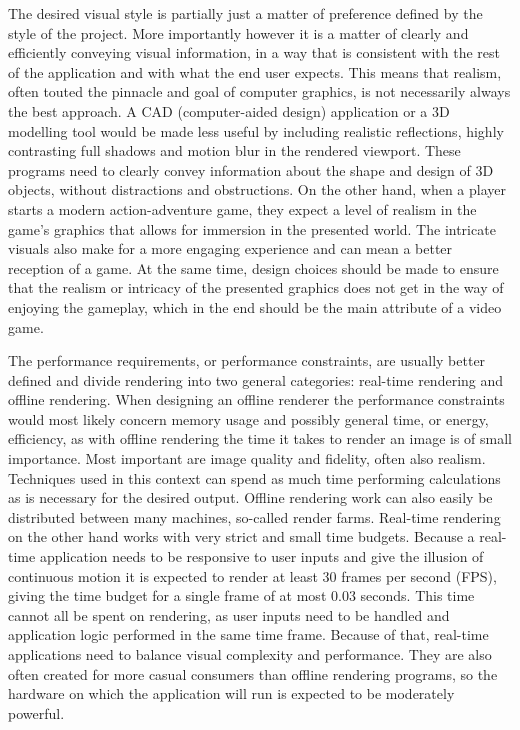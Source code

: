 The desired visual style is partially just a matter of preference defined by the style of the project. More importantly however it is a matter of clearly and efficiently conveying visual information, in a way that is consistent with the rest of the application and with what the end user expects. This means that realism, often touted the pinnacle and goal of computer graphics, is not necessarily always the best approach. A CAD (computer-aided design) application or a 3D modelling tool would be made less useful by including realistic reflections, highly contrasting full shadows and motion blur in the rendered viewport. These programs need to clearly convey information about the shape and design of 3D objects, without distractions and obstructions. On the other hand, when a player starts a modern action-adventure game, they expect a level of realism in the game's graphics that allows for immersion in the presented world. The intricate visuals also make for a more engaging experience and can mean a better reception of a game. At the same time, design choices should be made to ensure that the realism or intricacy of the presented graphics does not get in the way of enjoying the gameplay, which in the end should be the main attribute of a video game.

The performance requirements, or performance constraints, are usually better defined and divide rendering into two general categories: real-time rendering and offline rendering. When designing an offline renderer the performance constraints would most likely concern memory usage and possibly general time, or energy, efficiency, as with offline rendering the time it takes to render an image is of small importance. Most important are image quality and fidelity, often also realism. Techniques used in this context can spend as much time performing calculations as is necessary for the desired output. Offline rendering work can also easily be distributed between many machines, so-called render farms. Real-time rendering on the other hand works with very strict and small time budgets. Because a real-time application needs to be responsive to user inputs and give the illusion of continuous motion it is expected to render at least 30 frames per second (FPS), giving the time budget for a single frame of at most 0.03 seconds. This time cannot all be spent on rendering, as user inputs need to be handled and application logic performed in the same time frame. Because of that, real-time applications need to balance visual complexity and performance. They are also often created for more casual consumers than offline rendering programs, so the hardware on which the application will run is expected to be moderately powerful.

